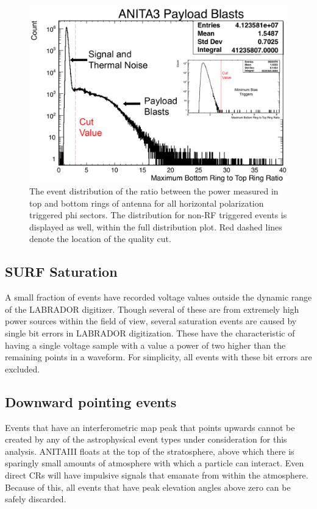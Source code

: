 \begin{figure}
	\centering
	\includegraphics[height=0.5\textheight]{figures/payloadBlastDistribution}
	\caption{The event distribution of the ratio between the power measured in top and bottom rings of antenna for all horizontal polarization triggered phi sectors.  The distribution for non-RF triggered events is displayed as well, within the full distribution plot.  Red dashed lines denote the location of the quality cut.}
	\label{fig:payloadBlastDist}
\end{figure}
	
	\subsection{SURF Saturation}
		A small fraction of events have recorded voltage values outside the dynamic range of the LABRADOR digitizer.  Though several of these are from extremely high power sources within the field of view, several saturation events are caused by single bit errors in LABRADOR digitization.  These have the characteristic of having a single voltage sample with a value a power of two higher than the remaining points in a waveform.  For simplicity, all events with these bit errors are excluded.
		
		
	\subsection{Downward pointing events}
		Events that have an interferometric map peak that points upwards cannot be created by any of the astrophysical event types under consideration for this analysis.  ANITAIII floats at the top of the stratosphere, above which there is sparingly small amounts of atmosphere with which a particle can interact.  Even direct CRs will have impulsive signals that emanate from within the atmosphere.  Because of this, all events that have peak elevation angles above zero can be safely discarded.
		
